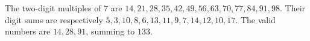 The two-digit multiples of $7$ are $14,21,28,35,42,49,56,63,70,77,84,91,98$. Their digit sums are respectively $5,3,10,8,6,13,11,9,7,14,12,10,17$. The valid numbers are $14,28,91$, summing to $\boxed{133}$.
